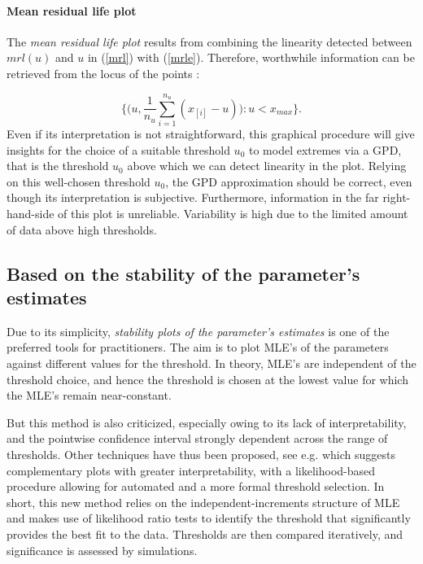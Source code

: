\paragraph*{Mean residual life plot} 
The \emph{mean residual life plot} results from combining the linearity detected between $mrl(u)$ and $u$ in (\ref{mrl}) with (\ref{mrle}). Therefore, worthwhile information can be retrieved from the locus of the points : 

\begin{equation}
\Bigg\{\bigg(u,\frac{1}{n_u}\sum_{i=1}^{n_u}(x_{[i]}-u)\bigg):u<x_{max}\Bigg\}.
\end{equation}
Even if its interpretation is not straightforward, this graphical procedure will give insights for the choice of a suitable threshold $u_0$ to model extremes via a GPD, that is the threshold $u_0$ above which we can detect linearity in the plot. Relying on this well-chosen threshold $u_0$, the GPD approximation should be correct, even though its interpretation is subjective. Furthermore, information in the far right-hand-side of this plot is unreliable. Variability is high due to the limited amount of data above high thresholds. %



\subsection*{Based on the stability of the parameter's estimates}


Due to its simplicity,  \textit{stability plots of the parameter's estimates} is one of the preferred tools for practitioners.
The aim is to plot MLE's of the parameters against different values for the threshold. In theory, MLE's are independent of the threshold choice, and hence the threshold is chosen at the lowest value for which the MLE's remain near-constant. 

But this method is also criticized, especially owing to its lack of interpretability, and the pointwise confidence interval strongly dependent across the range of thresholds.
Other techniques have thus been proposed, see e.g. \citet{Wadsworth_exploiting_2016} which suggests complementary plots with greater interpretability, with a likelihood-based procedure allowing for automated and a more formal threshold selection.
In short, this new method relies on the independent-increments
structure of MLE and makes use of likelihood ratio tests to identify the threshold that significantly provides the best fit to the data. Thresholds are then compared iteratively, and significance is assessed by simulations.

